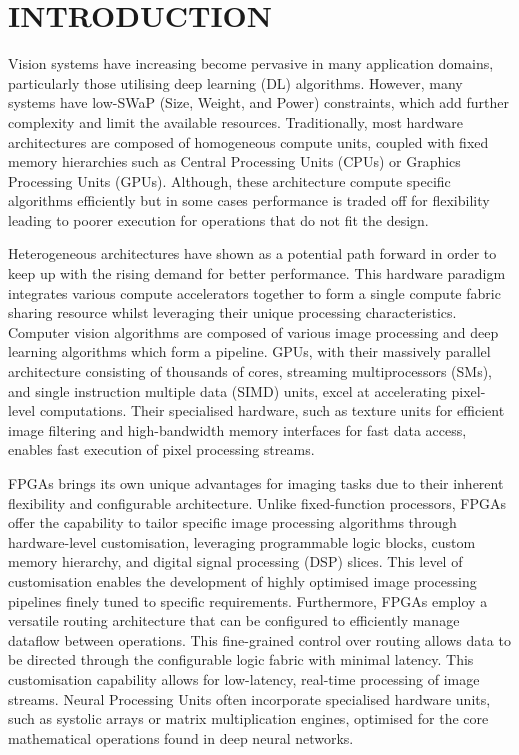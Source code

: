 \documentclass[]{spie}  %
\begin{document}


\section{INTRODUCTION}
\label{sec:intro}
Vision systems have increasing become pervasive in many application domains, particularly those utilising deep learning (DL) algorithms. However, many systems have low-SWaP (Size, Weight, and Power) constraints, which add further complexity and limit the available resources. Traditionally, most hardware architectures are composed of homogeneous compute units, coupled with fixed memory hierarchies such as Central Processing Units (CPUs) or Graphics Processing Units (GPUs). Although, these architecture compute specific algorithms efficiently but in some cases performance is traded off for flexibility leading to poorer execution for operations that do not fit the design.

Heterogeneous architectures have shown as a potential path forward in order to keep up with the rising demand for better performance. This hardware paradigm integrates various compute accelerators together to form a single compute fabric sharing resource whilst leveraging their unique processing characteristics. Computer vision algorithms are composed of various image processing and deep learning algorithms which form a pipeline. GPUs, with their massively parallel architecture consisting of thousands of cores, streaming multiprocessors (SMs), and single instruction multiple data (SIMD) units, excel at accelerating pixel-level computations. Their specialised hardware, such as texture units for efficient image filtering and high-bandwidth memory interfaces for fast data access, enables fast execution of pixel processing streams. 

FPGAs brings its own unique advantages for imaging tasks due to their inherent flexibility and configurable architecture. Unlike fixed-function processors, FPGAs offer the capability to tailor specific image processing algorithms through hardware-level customisation, leveraging programmable logic blocks, custom memory hierarchy, and digital signal processing (DSP) slices. This level of customisation enables the development of highly optimised image processing pipelines finely tuned to specific requirements. Furthermore, FPGAs employ a versatile routing architecture that can be configured to efficiently manage dataflow between operations. This fine-grained control over routing allows data to be directed through the configurable logic fabric with minimal latency. This customisation capability allows for low-latency, real-time processing of image streams. Neural Processing Units often incorporate specialised hardware units, such as systolic arrays or matrix multiplication engines, optimised for the core mathematical operations found in deep neural networks.
\end{document}
